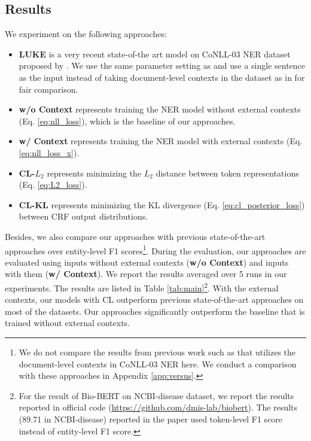 \documentclass[11pt,a4paper]{article}
\begin{document}
\subsection{Results}
We experiment on the following approaches:
\begin{itemize}[leftmargin=*]
    \item {\sc\textbf{LUKE}} is a very recent state-of-the art model on CoNLL-03 NER dataset proposed by \citet{yamada-etal-2020-luke}. We use the same parameter setting as \citet{yamada-etal-2020-luke} and use a single sentence as the input instead of taking document-level contexts in the dataset as in \citet{yamada-etal-2020-luke} for fair comparison.
    \item {\sc\textbf{w/o Context}} represents training the NER model without external contexts (Eq. \ref{eq:nll_loss}), which is the baseline of our approaches. 
    \item {\sc\textbf{w/ Context}} represents training the NER model with external contexts (Eq. \ref{eq:nll_loss_x}). 
    \item {\sc\textbf{CL-$L_2$}} represents minimizing the $L_2$ distance between token representations (Eq. \ref{eq:L2_loss}).
    \item {\sc\textbf{CL-KL}} represents minimizing the KL divergence (Eq. \ref{eq:cl_posterior_loss}) between CRF output distributions.
\end{itemize}
Besides, we also compare our approaches with previous state-of-the-art approaches over entity-level F1 scores\footnote{We do not compare the results from previous work such as \citet{yu-etal-2020-named,luoma-pyysalo-2020-exploring,yamada-etal-2020-luke} that utilizes the document-level contexts in CoNLL-03 NER here. We conduct a comparison with these approaches in Appendix \ref{app:versus}. }.
During the evaluation, our approaches are evaluated using inputs without external contexts ({\sc\textbf{w/o Context}}) and inputs with them ({\sc\textbf{w/ Context}}). We report the results averaged over 5 runs in our experiments. The results are listed in Table \ref{tab:main}\footnote{For the result of Bio-BERT \citep{lee2020biobert} on NCBI-disease dataset, we report the results reported in official code (\url{https://github.com/dmis-lab/biobert}). The results (89.71 in NCBI-disease) reported in the paper used token-level F1 score instead of entity-level F1 score.}. With the external contexts, our models with CL outperform previous state-of-the-art approaches on most of the datasets. Our approaches significantly outperform the baseline that is trained without external contexts. 
\end{document}
